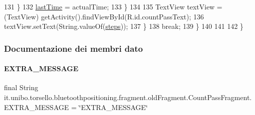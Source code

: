 \begin{DoxyCode}
131                     \}
132                     \hyperlink{classit_1_1unibo_1_1torsello_1_1bluetoothpositioning_1_1fragment_1_1oldFragment_1_1CountPassFragment_a0b2cb1d00e5c90bf8edc6997aee6fb2e_a0b2cb1d00e5c90bf8edc6997aee6fb2e}{lastTime} = actualTime;
133                 \}
134 
135                 TextView textView = (TextView) getActivity().findViewById(R.id.countPassText);
136                 textView.setText(String.valueOf(\hyperlink{classit_1_1unibo_1_1torsello_1_1bluetoothpositioning_1_1fragment_1_1oldFragment_1_1CountPassFragment_a61757f08791ab239bac96f4a086b8d44_a61757f08791ab239bac96f4a086b8d44}{steps}));
137             \}
138             \textcolor{keywordflow}{break};
139         \}
140 
141 
142     \}
\end{DoxyCode}


\subsubsection{Documentazione dei membri dato}
\hypertarget{classit_1_1unibo_1_1torsello_1_1bluetoothpositioning_1_1fragment_1_1oldFragment_1_1CountPassFragment_a5729b3e7bd788b7d1b586938ced085d8_a5729b3e7bd788b7d1b586938ced085d8}{}\label{classit_1_1unibo_1_1torsello_1_1bluetoothpositioning_1_1fragment_1_1oldFragment_1_1CountPassFragment_a5729b3e7bd788b7d1b586938ced085d8_a5729b3e7bd788b7d1b586938ced085d8} 
\paragraph{\texorpdfstring{E\+X\+T\+R\+A\+\_\+\+M\+E\+S\+S\+A\+GE}{EXTRA\_MESSAGE}}
{\footnotesize\ttfamily final String it.\+unibo.\+torsello.\+bluetoothpositioning.\+fragment.\+old\+Fragment.\+Count\+Pass\+Fragment.\+E\+X\+T\+R\+A\+\_\+\+M\+E\+S\+S\+A\+GE = \char`\"{}E\+X\+T\+R\+A\+\_\+\+M\+E\+S\+S\+A\+GE\char`\"{}\hspace{0.3cm}{\ttfamily [static]}}

